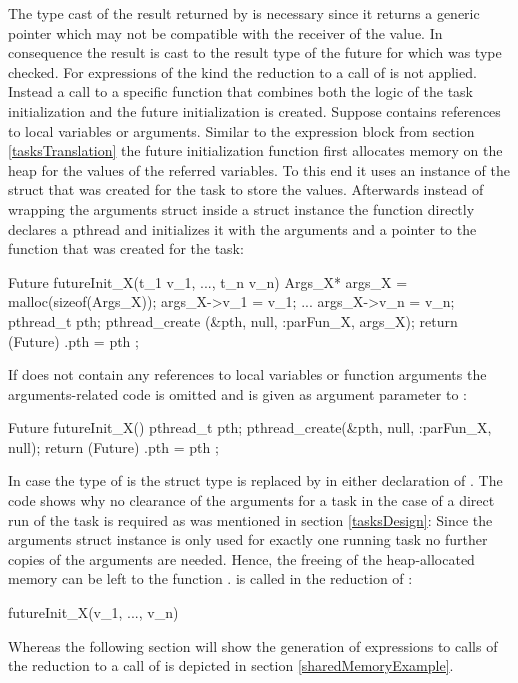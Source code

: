 The type cast of the result returned by  is necessary since it returns a generic pointer  which may not be compatible with the receiver of the value. In consequence the result is cast to the result type of the future for which  was type checked. 
For expressions of the kind  the reduction to a call of  is not applied. Instead a call to a specific function  that combines both the logic of the task initialization and the future initialization is created. Suppose  contains references to local variables or arguments. Similar to the  expression block from section \ref{tasksTranslation} the future initialization function first allocates memory on the heap for the values of the referred variables. To this end it uses an instance of the  struct that was created for the task to store the values. Afterwards instead of wrapping the arguments struct inside a  struct instance the function directly declares a pthread and initializes it with the arguments and a pointer to the function  that was created for the task:
\begin{ccode}
Future futureInit_X(t_1 v_1, ..., t_n v_n) { 
  Args_X* args_X = malloc(sizeof(Args_X)); 
  args_X->v_1 = v_1; 
  ...
  args_X->v_n = v_n; 
  pthread_t pth; 
  pthread_create (&pth, null, :parFun_X, args_X); 
  return (Future){ .pth = pth }; 
}
\end{ccode}
If  does not contain any references to local variables or function arguments the arguments-related code is omitted and  is given as argument parameter to :
\begin{ccode}
Future futureInit_X() {
  pthread_t pth; 
  pthread_create(&pth, null, :parFun_X, null); 
  return (Future){ .pth = pth }; 
}
\end{ccode}
In case the type of  is  the struct type  is replaced by  in either declaration of . The code shows why no clearance of the arguments for a task in the case of a direct run of the task is required as was mentioned in section \ref{tasksDesign}: Since the arguments struct instance is only used for exactly one running task no further copies of the arguments are needed. Hence, the freeing of the heap-allocated memory can be left to the function .  is called in the reduction of :
\begin{ccode}
futureInit_X(v_1, ..., v_n)
\end{ccode}
Whereas the following section will show the generation of expressions  to calls of  the reduction to a call of  is depicted in section \ref{sharedMemoryExample}.

